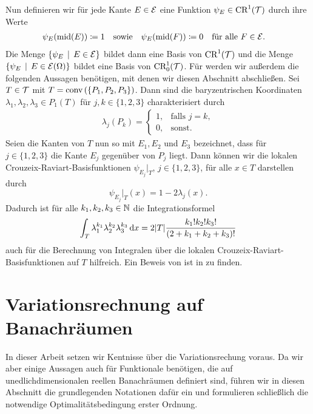 Nun definieren wir für jede Kante $E\in\mathcal{E}$ eine Funktion
$\psi_E\in\textup{CR}^1(\mathcal{T})$ durch ihre Werte
\begin{align*}
  \psi_E(\textup{mid}(E))&\coloneqq 1 
  &&\text{sowie} 
  &\psi_E(\textup{mid}(F))&\coloneqq 0\quad\text{für alle } F\in\mathcal{E}.
\end{align*}
Die Menge $\{\psi_E\,\mid\,E\in\mathcal{E}\}$ bildet dann eine Basis von
$\textup{CR}^1(\mathcal{T})$ und die Menge
$\{\psi_E\,\mid\,E\in\mathcal{E}(\Omega)\}$ bildet eine Basis von
$\textup{CR}^1_0(\mathcal{T})$. 
Für  werden wir außerdem die folgenden Aussagen
benötigen, mit denen wir diesen Abschnitt abschließen.
Sei $T\in\mathcal{T}$ mit $T=\textup{conv}\left(\{P_1,P_2,P_3\}\right)$. 
Dann sind die baryzentrischen Koordinaten $\lambda_1,\lambda_2,\lambda_3\in
P_1(T)$ für $j,k\in\{1,2,3\}$ charakterisiert durch
\begin{align*}
  \lambda_j(P_k)
  =
  \begin{cases}
    1,&\text{falls }  j=k,\\
    0,&\text{sonst.}
  \end{cases}
\end{align*}
Seien die Kanten von $T$ nun so mit $E_1,E_2$ und $E_3$ bezeichnet, dass für
$j\in\{1,2,3\}$ die Kante $E_j$ gegenüber von $P_j$ liegt. 
Dann können wir die lokalen Crouzeix-Raviart-Basisfunktionen 
$\psi_{E_j}\!|_T$, $j\in\{1,2,3\}$, für alle $x\in T$ darstellen durch
\begin{equation}
  \label{eq:connectionCrBarycentric}
  \psi_{E_j}\!|_T(x)=1-2\lambda_j(x).
\end{equation}
Dadurch ist für alle $k_1,k_2,k_3\in\mathbb{N}$ die Integrationsformel
\begin{equation}
  \label{eq:formulaIntegrationBarycentricCoordinates}
  \int_T \lambda_1^{k_1}\lambda_2^{k_2}\lambda_3^{k_3}\,\mathrm{d}x
  =
  2|T|\frac{k_1!k_2!k_3!}{(2+k_1+k_2+k_3)!}
\end{equation}
auch für die Berechnung von Integralen über die lokalen
Crouzeix-Raviart-Basisfunktionen auf $T$ hilfreich. Ein Beweis von 
 ist in 
\cite{EM73} zu finden.


\section{Variationsrechnung auf Banachräumen}
\label{sec:variationalCalculus}

In dieser Arbeit setzen wir Kentnisse über die Variationsrechung voraus. 
Da wir aber einige Aussagen auch für Funktionale benötigen, die auf
unedlichdimensionalen reellen Banachräumen definiert sind, führen
wir in diesen Abschnitt die grundlegenden Notationen dafür ein und formulieren
schließlich die notwendige Optimalitätsbedingung erster Ordnung.

